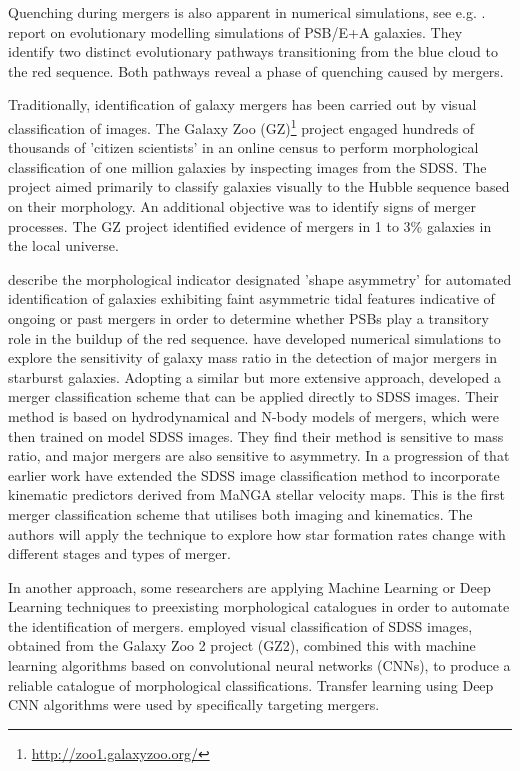 Quenching during mergers is also apparent in numerical simulations, see e.g. \cite{2019MNRAS.484.2447D}. \citet{2019NatAs...3..440P} report on evolutionary modelling simulations of PSB/E+A galaxies. They identify two distinct evolutionary pathways transitioning from the blue cloud to the red sequence. Both pathways reveal a phase of quenching caused by mergers.

Traditionally, identification of galaxy mergers has been carried out by visual classification of images. The Galaxy Zoo (GZ)\footnote{\href{http://zoo1.galaxyzoo.org/}{http://zoo1.galaxyzoo.org/}} project \citet{10.1111/j.1365-2966.2008.13689.x,10.1111/j.1365-2966.2010.17432.x, 2017MNRAS.464.4176W} engaged hundreds of thousands of 'citizen scientists' in an online census to perform morphological classification of one million galaxies by inspecting images from the SDSS. The project aimed primarily to classify galaxies visually to the Hubble sequence based on their morphology. An additional objective was to identify signs of merger processes. The GZ project identified evidence of mergers in 1 to 3\% galaxies in the local universe.

\cite{2016MNRAS.456.3032P} describe the morphological indicator designated 'shape asymmetry' for automated identification of galaxies exhibiting faint asymmetric tidal features indicative of ongoing or past mergers in order to determine whether PSBs play a transitory role in the buildup of the red sequence. \cite{2011arXiv1102.0550B} have developed numerical simulations to explore the sensitivity of galaxy mass ratio in the detection of major mergers in starburst galaxies. Adopting a similar but more extensive approach, \cite{2019ApJ...872...76N} developed a merger classification scheme that can be applied directly to SDSS images. Their method is based on hydrodynamical and N-body models of mergers, which were then trained on model SDSS images. They find their method is sensitive to mass ratio, and major mergers are also sensitive to asymmetry. In a progression of that earlier work  \cite{2019DDA....5020304N} have extended the SDSS image classification method to incorporate kinematic predictors derived from MaNGA stellar velocity maps. This is the first merger classification scheme that utilises both imaging and kinematics. The authors will apply the technique to explore how star formation rates change with different stages and types of merger. 

In another approach, some researchers are applying Machine Learning or Deep Learning techniques to preexisting morphological catalogues in order to automate the identification of mergers. \citet{2018MNRAS.476.3661D} employed visual classification of SDSS images, obtained from the Galaxy Zoo 2 project (GZ2), combined this with machine learning algorithms based on convolutional neural networks (CNNs), to produce a reliable catalogue of  morphological classifications. Transfer learning using Deep CNN algorithms were used by \citet{2018MNRAS.479..415A} specifically targeting mergers. 

